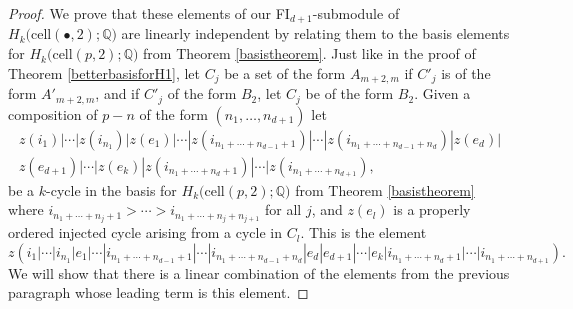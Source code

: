 \documentclass[12py]{amsart}%
\theoremstyle{definition}\newtheorem{definition}[thm]{Definition}
\theoremstyle{definition}
\newcommand{\Q}{\ensuremath{\mathbb{Q}}}
\begin{document}
\begin{proof}
We prove that these elements of our FI$_{d+1}$-submodule of $H_{k}\big(\text{cell}(\bullet, 2);\Q\big)$ are linearly independent by relating them to the basis elements for $H_{k}\big(\text{cell}(p,2);\Q\big)$ from Theorem \ref{basistheorem}. Just like in the proof of Theorem \ref{betterbasisforH1}, let $C_{j}$ be a set of the form $A_{m+2,m}$ if $C'_{j}$ is of the form $A'_{m+2, m}$, and if $C'_{j}$ of the form $B_{2}$, let $C_{j}$ be of the form $B_{2}$. Given a composition of $p-n$ of the form $(n_{1},\dots, n_{d+1})$ let
\begin{multline*}
z(i_{1})|\cdots|z(i_{n_{1}})|z(e_{1})|\cdots|z(i_{n_{1}+\cdots+n_{d-1}+1})|\cdots|z(i_{n_{1}+\cdots+n_{d-1}+n_{d}})|z(e_{d})|\\
z(e_{d+1})|\cdots|z(e_{k})|z(i_{n_{1}+\cdots+n_{d}+1})|\cdots|z(i_{n_{1}+\cdots+n_{d+1}}),
\end{multline*}
be a $k$-cycle in the basis for $H_{k}\big(\text{cell}(p,2);\Q\big)$ from Theorem \ref{basistheorem} where $i_{n_{1}+\cdots+n_{j}+1}>\cdots>i_{n_{1}+\cdots+n_{j}+n_{j+1}}$ for all $j$, and $z(e_{l})$ is a properly ordered injected cycle arising from a cycle in $C_{l}$. This is the element
\[
z(i_{1}|\cdots|i_{n_{1}}|e_{1}|\cdots|i_{n_{1}+\cdots+n_{d-1}+1}|\cdots|i_{n_{1}+\cdots+n_{d-1}+n_{d}}|e_{d}|e_{d+1}|\cdots|e_{k}|i_{n_{1}+\cdots+n_{d}+1}|\cdots|i_{n_{1}+\cdots+n_{d+1}}).
\]
We will show that there is a linear combination of the elements from the previous paragraph whose leading term is this element.


\end{proof}
\end{document}
